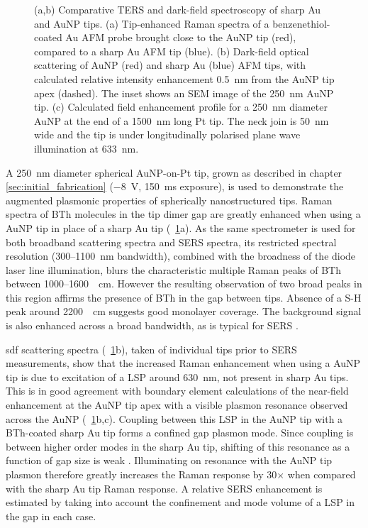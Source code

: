 \documentclass{article}
\begin{document}
\begin{figure}[bt]
{%
(a,b) Comparative TERS and dark-field spectroscopy of sharp Au and AuNP tips. (a) Tip-enhanced Raman spectra of a benzenethiol-coated Au AFM probe brought close to the AuNP tip (red), compared to a sharp Au AFM tip (blue). (b) Dark-field optical scattering of AuNP (red) and sharp Au (blue) AFM tips, with calculated relative intensity enhancement \SI{0.5}{nm} from the AuNP tip apex (dashed). The inset shows an SEM image of the \SI{250}{nm} AuNP tip. %
(c) Calculated field enhancement profile for a \SI{250}{nm} diameter AuNP at the end of a \SI{1500}{nm} long Pt tip. The neck join is \SI{50}{nm} wide and the tip is under longitudinally polarised plane wave illumination at \SI{633}{nm}.}
\label{fig:ters_comparison}
\end{figure}

A \SI{250}{nm} diameter spherical AuNP-on-Pt tip, grown as described in chapter \ref{sec:initial_fabrication} (\SI{-8}{V}, \SI{150}{ms} exposure), is used to demonstrate the augmented plasmonic properties of spherically nanostructured tips. Raman spectra of BTh molecules in the tip dimer gap are greatly enhanced when using a AuNP tip in place of a sharp Au tip (\figurename~\ref{fig:ters_comparison}a). As the same spectrometer is used for both broadband scattering spectra and SERS spectra, its restricted spectral resolution (300--\SI{1100}{nm} bandwidth), combined with the broadness of the diode laser line illumination, blurs the characteristic multiple Raman peaks of BTh between 1000--\SI{1600}{\per\centi\metre}. However the resulting observation of two broad peaks in this region affirms the presence of BTh in the gap between tips. {\color{red}Absence of a S-H peak around \SI{2200}{\per\centi\metre} suggests good monolayer coverage.} The background signal is also enhanced across a broad bandwidth, as is typical for SERS \cite{mahajan2009}.

\Gls{sdf} scattering spectra (\figurename~\ref{fig:ters_comparison}b), taken of individual tips prior to SERS measurements, show that the increased Raman enhancement when using a AuNP tip is due to excitation of a LSP around \SI{630}{nm}, not present in sharp Au tips. This is in good agreement with boundary element calculations of the near-field enhancement at the AuNP tip apex with a visible plasmon resonance observed across the AuNP (\figurename~\ref{fig:ters_comparison}b,c).
Coupling between this LSP in the AuNP tip with a BTh-coated sharp Au tip forms a confined gap plasmon mode. Since coupling is between higher order modes in the sharp Au tip, shifting of this resonance as a function of gap size is weak \cite{downes2006, hugall2012}. Illuminating on resonance with the AuNP tip plasmon therefore greatly increases the Raman response by 30$\times$ when compared with the sharp Au tip Raman response. A relative SERS enhancement is estimated by taking into account the confinement and mode volume of a LSP in the gap in each case.
\end{document}
